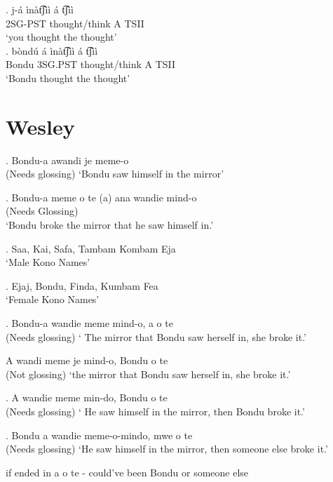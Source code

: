 \documentclass{assets/fieldnotes}
\begin{document}
{\exg. j-á ìnàt͡ʃìì á t͡ʃìì\\
2SG-PST thought/think A TSII\\
`you thought the thought' \\

\exg. bòndú á ìnàt͡ʃìì á t͡ʃìì\\
Bondu 3SG.PST thought/think A TSII\\
`Bondu thought the thought' \\


    
\section{Wesley}


\exg. Bondu-a awandi je meme-o \\
(Needs glossing)
`Bondu saw himself in the mirror'

\exg. Bondu-a meme o te (a) ana wandie mind-o\\
(Needs Glossing)\\
`Bondu broke the mirror that he saw himself in.'

\exg. Saa, Kai, Safa, Tambam Kombam Eja \\
`Male Kono Names'

\exg. Ejaj, Bondu, Finda, Kumbam Fea\\
`Female Kono Names'

\exg. Bondu-a wandie meme mind-o, a o te\\
(Needs glossing)
` The mirror that Bondu saw herself in, she broke it.'

\exg *A wandi meme je mind-o, Bondu o te\\
(Not glossing)
`the mirror that Bondu saw herself in, she broke it.'

\exg. A wandie meme min-do, Bondu o te\\
(Needs glossing)
` He saw himself in the mirror, then Bondu broke it.'

\exg. Bondu a wandie meme-o-mindo, mwe o te\\
(Needs glossing)
`He saw himself in the mirror, then someone else broke it.'

\item if ended in a o te - could've been Bondu or someone else



}
\end{document}

